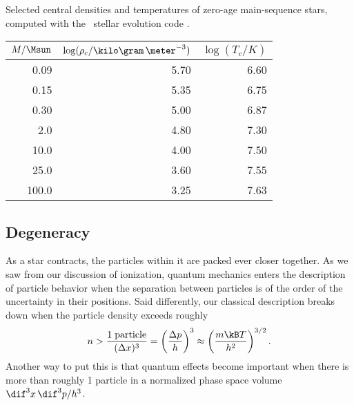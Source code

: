 \begin{margintable}[-16\baselineskip]
\caption[Central densities and temperatures of zero-age main-sequence stars]{\label{t.stellar-rhoT}Selected central densities and temperatures of zero-age main-sequence stars, computed with the \mesa\ stellar evolution code \citep{Paxton2010Modules-for-Exp}.}
\begin{tabular}{rrr}
$M/\Msun$ & $\log(\rho_{c}/\kilo\gram\,\meter^{-3})$ & $\log(T_{c}/K)$\\
\hline
0.09 & 5.70 & 6.60\\
0.15 & 5.35 & 6.75\\
0.30 & 5.00 & 6.87\\
2.0 & 4.80 & 7.30\\
10.0 & 4.00 & 7.50\\
25.0 & 3.60 & 7.55\\
100.0 & 3.25 & 7.63\\
\end{tabular}
\end{margintable}

\subsection{Degeneracy}
\label{s.degeneracy}

As a star contracts, the particles within it are packed ever closer together.  As we saw from our discussion of ionization, quantum mechanics enters the description of particle behavior when the separation between particles is of the order of the uncertainty in their positions.  Said differently, our classical description breaks down when the particle density exceeds roughly
\begin{equation}\label{e.heuristic-quantum-density}
    n > \frac{1\;\textrm{particle}}{(\Delta x)^3} 
    = \left(\frac{\Delta p}{h}\right)^3 
    \approx \left(\frac{m\kB T}{h^2}\right)^{3/2}.
\end{equation}
Another way to put this is that quantum effects become important when there is more than roughly 1 particle in a normalized phase space volume $\dif^{3}x\,\dif^{3}p/h^{3}$.

